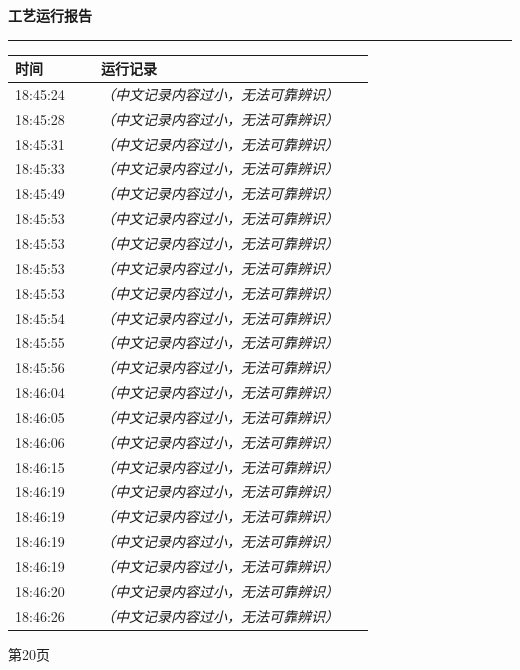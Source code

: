 \documentclass[UTF8,10pt,a4paper,fontset=fandol]{ctexart}
\begin{document}
\begin{minipage}[t]{0.47\linewidth}
\centering
\textbf{工艺运行报告}\\[-2pt]
\rule{\linewidth}{0.4pt}

\scriptsize
\begin{tabular}{|p{0.22\linewidth}|p{0.70\linewidth}|}
\hline
时间 & 运行记录 \\ \hline
18:45:24 & \textit{（中文记录内容过小，无法可靠辨识）} \\ \hline
18:45:28 & \textit{（中文记录内容过小，无法可靠辨识）} \\ \hline
18:45:31 & \textit{（中文记录内容过小，无法可靠辨识）} \\ \hline
18:45:33 & \textit{（中文记录内容过小，无法可靠辨识）} \\ \hline
18:45:49 & \textit{（中文记录内容过小，无法可靠辨识）} \\ \hline
18:45:53 & \textit{（中文记录内容过小，无法可靠辨识）} \\ \hline
18:45:53 & \textit{（中文记录内容过小，无法可靠辨识）} \\ \hline
18:45:53 & \textit{（中文记录内容过小，无法可靠辨识）} \\ \hline
18:45:53 & \textit{（中文记录内容过小，无法可靠辨识）} \\ \hline
18:45:54 & \textit{（中文记录内容过小，无法可靠辨识）} \\ \hline
18:45:55 & \textit{（中文记录内容过小，无法可靠辨识）} \\ \hline
18:45:56 & \textit{（中文记录内容过小，无法可靠辨识）} \\ \hline
18:46:04 & \textit{（中文记录内容过小，无法可靠辨识）} \\ \hline
18:46:05 & \textit{（中文记录内容过小，无法可靠辨识）} \\ \hline
18:46:06 & \textit{（中文记录内容过小，无法可靠辨识）} \\ \hline
18:46:15 & \textit{（中文记录内容过小，无法可靠辨识）} \\ \hline
18:46:19 & \textit{（中文记录内容过小，无法可靠辨识）} \\ \hline
18:46:19 & \textit{（中文记录内容过小，无法可靠辨识）} \\ \hline
18:46:19 & \textit{（中文记录内容过小，无法可靠辨识）} \\ \hline
18:46:19 & \textit{（中文记录内容过小，无法可靠辨识）} \\ \hline
18:46:20 & \textit{（中文记录内容过小，无法可靠辨识）} \\ \hline
18:46:26 & \textit{（中文记录内容过小，无法可靠辨识）} \\ \hline
\end{tabular}

\smallskip
第20页
\end{minipage}
\end{document}
